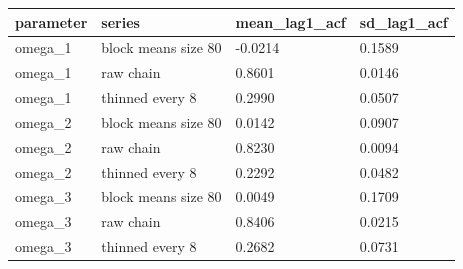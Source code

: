\begin{tabular}{llll}
\toprule
parameter & series & mean\_lag1\_acf & sd\_lag1\_acf \\
\midrule
omega\_1 & block means size 80 & -0.0214 & 0.1589 \\
omega\_1 & raw chain & 0.8601 & 0.0146 \\
omega\_1 & thinned every 8 & 0.2990 & 0.0507 \\
omega\_2 & block means size 80 & 0.0142 & 0.0907 \\
omega\_2 & raw chain & 0.8230 & 0.0094 \\
omega\_2 & thinned every 8 & 0.2292 & 0.0482 \\
omega\_3 & block means size 80 & 0.0049 & 0.1709 \\
omega\_3 & raw chain & 0.8406 & 0.0215 \\
omega\_3 & thinned every 8 & 0.2682 & 0.0731 \\
\bottomrule
\end{tabular}
